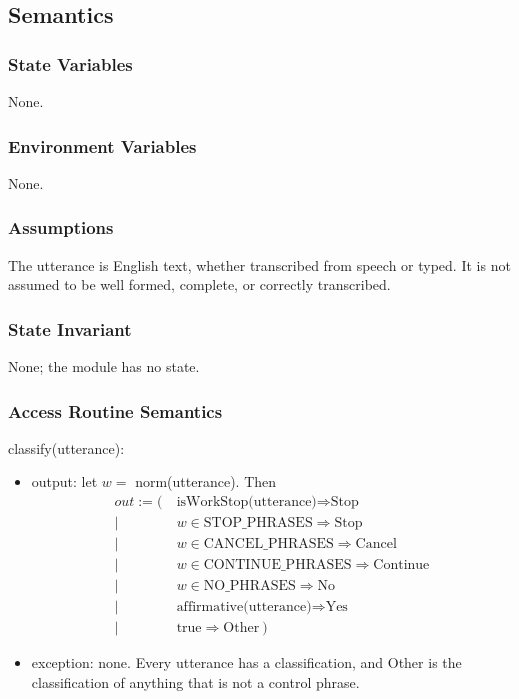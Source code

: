 \documentclass[12pt, titlepage]{article}
\begin{document}
\subsection{Semantics}

\subsubsection{State Variables}

None.

\subsubsection{Environment Variables}

None.

\subsubsection{Assumptions}

The utterance is English text, whether transcribed from speech or typed. It is
not assumed to be well formed, complete, or correctly transcribed.

\subsubsection{State Invariant}

None; the module has no state.

\subsubsection{Access Routine Semantics}

\noindent classify(utterance):
\begin{itemize}
\item output: let $w =$ norm(utterance). Then
\begin{align*}
out := (\ &\text{isWorkStop(utterance)} \Rightarrow \text{Stop}\\
 |\ &w \in \text{STOP\_PHRASES} \Rightarrow \text{Stop}\\
 |\ &w \in \text{CANCEL\_PHRASES} \Rightarrow \text{Cancel}\\
 |\ &w \in \text{CONTINUE\_PHRASES} \Rightarrow \text{Continue}\\
 |\ &w \in \text{NO\_PHRASES} \Rightarrow \text{No}\\
 |\ &\text{affirmative(utterance)} \Rightarrow \text{Yes}\\
 |\ &\text{true} \Rightarrow \text{Other}\ )
\end{align*}
\item exception: none. Every utterance has a classification, and Other is the
classification of anything that is not a control phrase.
\end{itemize}
\end{document}
